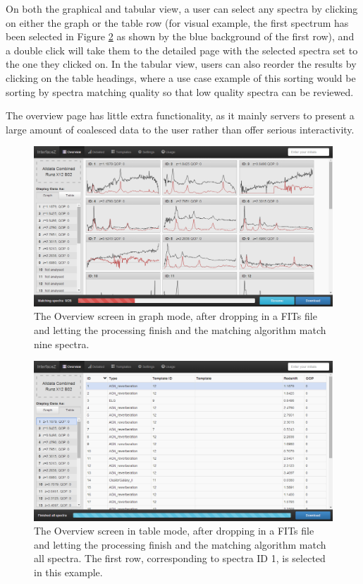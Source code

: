 \documentclass[titlesmallcaps, examinerscopy, copyrightpage]{uqthesis}
\begin{document}
On both the graphical and tabular view, a user can select any spectra by clicking on either the graph or the table row (for visual example, the first spectrum has been selected in Figure \ref{fig:overviewTable} as shown by the blue background of the first row), and a double click will take them to the detailed page with the selected spectra set to the one they clicked on. In the tabular view, users can also reorder the results by clicking on the table headings, where a use case example of this sorting would be sorting by spectra matching quality so that low quality spectra can be reviewed.

The overview page has little extra functionality, as it mainly servers to present a large amount of coalesced data to the user rather than offer serious interactivity. 



\begin{figure}[ht!]
\includegraphics[width=1\textwidth]{images/overviewGraph.png} 
\centering
\caption{The Overview screen in graph mode, after dropping in a FITs file and letting the processing finish and the matching algorithm match nine spectra.}
\label{fig:overviewGraph}
\end{figure}

\begin{figure}[ht!]
\includegraphics[width=1\textwidth]{images/overviewTable.png} 
\centering
\caption{The Overview screen in table mode, after dropping in a FITs file and letting the processing finish and the matching algorithm match all spectra. The first row, corresponding to spectra ID 1, is selected in this example.}
\label{fig:overviewTable}
\end{figure}
\end{document}
